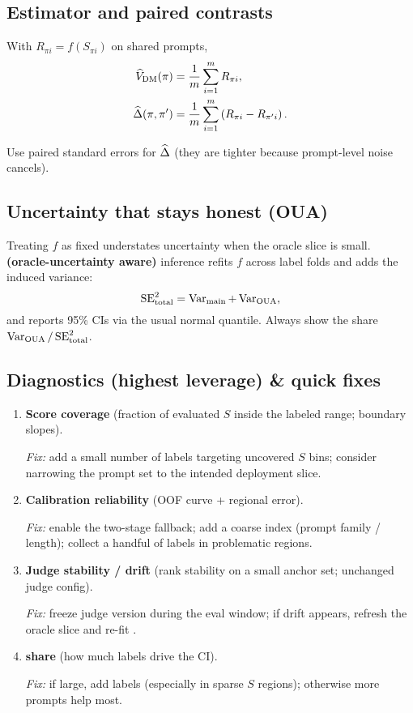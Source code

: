 \subsection{Estimator and paired contrasts}

With $R_{\pi i} = f(S_{\pi i})$ on shared prompts,
\begin{align}
\widehat{V}_{\text{DM}}(\pi) &= \frac{1}{m} \sum_{i=1}^m R_{\pi i}, \\
\widehat{\Delta}(\pi, \pi') &= \frac{1}{m} \sum_{i=1}^m \left( R_{\pi i} - R_{\pi' i} \right).
\end{align}

Use paired standard errors for $\widehat{\Delta}$ (they are tighter because prompt-level noise cancels).

\subsection{Uncertainty that stays honest (OUA)}

Treating $f$ as fixed understates uncertainty when the oracle slice is small. \textbf{\oua{} (oracle-uncertainty aware)} inference refits $f$ across label folds and adds the induced variance:
\begin{equation}
\operatorname{SE}^2_{\text{total}} = \operatorname{Var}_{\text{main}} + \operatorname{Var}_{\text{OUA}},
\end{equation}
and reports 95\% CIs via the usual normal quantile. Always show the \oua{} share $\operatorname{Var}_{\text{OUA}}/\operatorname{SE}^2_{\text{total}}$.

\subsection{Diagnostics (highest leverage) \& quick fixes}

\begin{enumerate}[label=(\alph*)]
\item \textbf{Score coverage} (fraction of evaluated $S$ inside the labeled range; boundary slopes).

\emph{Fix:} add a small number of labels targeting uncovered $S$ bins; consider narrowing the prompt set to the intended deployment slice.

\item \textbf{Calibration reliability} (OOF curve + regional error).

\emph{Fix:} enable the two-stage \autocal{} fallback; add a coarse index (prompt family / length); collect a handful of labels in problematic regions.

\item \textbf{Judge stability / drift} (rank stability on a small anchor set; unchanged judge config).

\emph{Fix:} freeze judge version during the eval window; if drift appears, refresh the oracle slice and re-fit \autocal.

\item \textbf{\oua{} share} (how much labels drive the CI).

\emph{Fix:} if large, add labels (especially in sparse $S$ regions); otherwise more prompts help most.
\end{enumerate}

